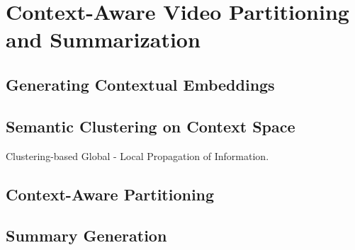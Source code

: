 \section{Context-Aware Video Partitioning and Summarization}
\label{section:method-model}

    \subsection{Generating Contextual Embeddings}

    \subsection{Semantic Clustering on Context Space}
        Clustering-based Global - Local Propagation of Information.

    \subsection{Context-Aware Partitioning}

    \subsection{Summary Generation}